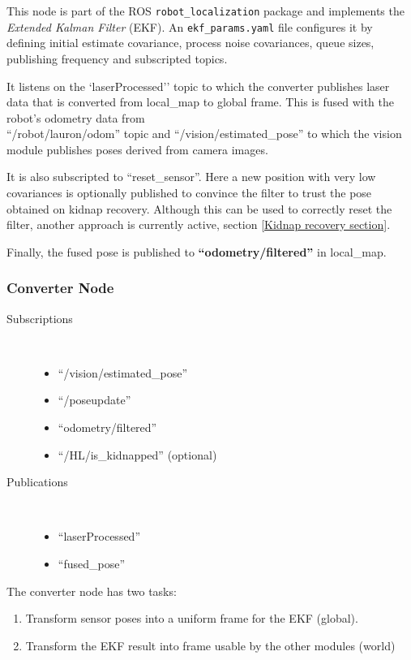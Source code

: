 This node is part of the ROS \texttt{robot\_localization} package and implements the \textit{Extended Kalman Filter} (EKF). An \texttt{ekf\_params.yaml} file configures it by defining initial estimate covariance, process noise covariances, queue sizes, publishing frequency and subscripted topics.

It listens on the `laserProcessed'' topic to which the converter publishes laser data that is converted from local\_map to global frame. This is fused with the robot's odometry data from \\ ``/robot/lauron/odom'' topic and ``/vision/estimated\_pose'' to which the vision module publishes poses derived from camera images.

It is also subscripted to ``reset\_sensor''. Here a new position with very low covariances is optionally published to convince the filter to trust the pose obtained on kidnap recovery. Although this can be used to correctly reset the filter, another approach is currently active, section \ref{Kidnap recovery section}.

Finally, the fused pose is published to \textbf{``odometry/filtered''} in local\_map.

\subsubsection{Converter Node}
\begin{description}
\item[Subscriptions]\
	\begin{itemize}
	\item ``/vision/estimated\_pose'' 
	\item ``/poseupdate'' 
	\item ``odometry/filtered'' 
	\item ``/HL/is\_kidnapped'' (optional)
	\end{itemize}
	
\item[Publications]\
	\begin{itemize}
	\item ``laserProcessed''
	\item ``fused\_pose''
	\end{itemize}
\end{description}

The converter node has two tasks:

\begin{enumerate}
\item Transform sensor poses into a uniform frame for the EKF (global).
\item Transform the EKF result into frame usable by the other modules (world)
\end{enumerate}

